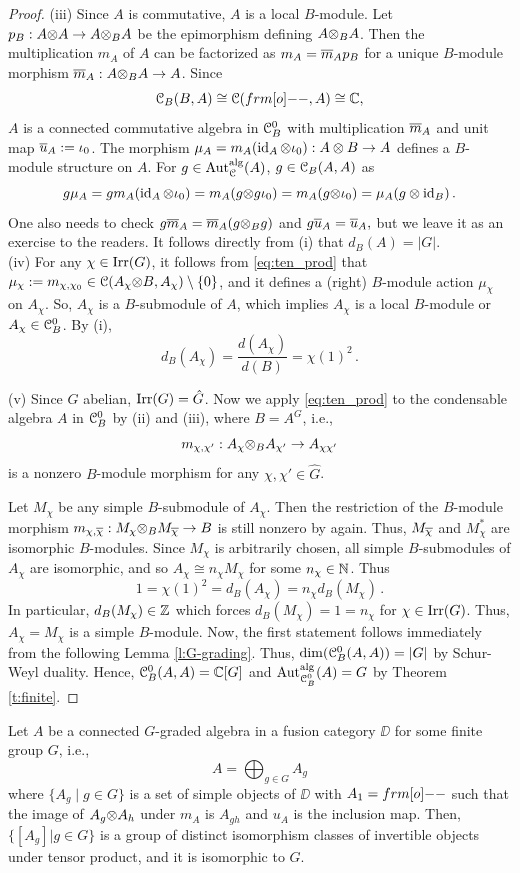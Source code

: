 \documentclass{amsart}
\begin{document}
\begin{proof}
(iii) Since $A$ is commutative, $A$ is a local $B$-module. Let $p_B: A {\otimes} A \to A {\otimes}_B A$ be the epimorphism defining $A {\otimes}_B A$. Then the multiplication $m_A$ of $A$ can be factorized as $m_A = \overline m_A p_B$ for a unique $B$-module morphism $\overline m_A: A {\otimes}_B A \to A$. Since
$$
\CB(B, A) \cong \CC(\1, A) \cong \BC,
$$
$A$ is a connected commutative algebra in ${{\EuScript{C}}_B^0}$ with multiplication $\overline m_A$ and unit map $\overline u_A :=\iota_0$. The morphism $\mu_A = m_A (\operatorname{id}_A {\otimes} \iota_0): A\otimes B\to A$ defines a $B$-module structure on $A.$
For $g \in {\operatorname{Aut}_{\EuScript{C}}^{\operatorname{alg}}}(A)$, $g \in {{\EuScript{C}}_B}(A,A)$ as 
$$
g \mu_A = g m_A (\operatorname{id}_A {\otimes} \iota_0) = m_A (g {\otimes} g \iota_0) =m_A (g {\otimes} \iota_0)=\mu_A(g\otimes \operatorname{id}_B)\,.
$$
One also needs to check $g \overline m_A = \overline m_A(g {\otimes}_B g)$ and $g \overline u_A=\overline u_A,$ but we leave it as an exercise to the readers. It follows directly from (i) that $d_B(A) =|G|$.\\
(iv) 
For any $\chi \in \operatorname{Irr}(G)$,  it follows from \eqref{eq:ten_prod} that $\mu_\chi:=m_{\chi, \chi_0} \in {\EuScript{C}}(A_\chi{\otimes} B, A_\chi) \setminus\{0\}$, and it
defines a (right) $B$-module action $\mu_\chi$ on $A_\chi$. So, $A_\chi$ is a $B$-submodule of $A$, which implies $A_\chi$ is a local $B$-module or $A_\chi \in {{\EuScript{C}}_B^0}$. By (i),
$$
d_B(A_\chi)=\frac{d(A_\chi)}{d(B)} = \chi(1)^2\,.
$$

(v) Since $G$ abelian, $\operatorname{Irr}(G)=\hat{G}$.  Now we apply \eqref{eq:ten_prod} to the condensable algebra $A$ in ${{\EuScript{C}}_B^0}$ by (ii) and (iii), where $B=A^G$, i.e.,
$$
m_{\chi, \chi'} : A_\chi {\otimes}_B A_{\chi'} \to A_{\chi\chi'} 
$$
is a nonzero $B$-module morphism for any  $\chi, \chi'  \in \hat G$. 

 Let $M_\chi$ be any simple $B$-submodule of $A_\chi$. Then the restriction of the $B$-module morphism $m_{\chi, \overline\chi}: M_\chi {\otimes}_B M_{\overline\chi} \to B$ is still nonzero  by \cite[Lemma 5.3]{DNRX2025} again.  Thus, $M_{\overline\chi}$ and $M_\chi^*$ are isomorphic $B$-modules. Since $M_\chi$ is arbitrarily chosen, all simple $B$-submodules of $A_\chi$ are isomorphic, and so $A_\chi \cong n_\chi M_\chi$ for some $n_\chi \in \mathbb{N}$. Thus
$$
1=\chi(1)^2 = d_B(A_\chi) = n_\chi d_B(M_\chi)\,.
$$
In particular, $d_B(M_\chi) \in \mathbb{Z}$ which forces $d_B(M_\chi)=1=n_\chi$ for $\chi \in \operatorname{Irr}(G)$.  Thus,  $A_\chi = M_\chi$ is a simple $B$-module. Now, the first statement follows immediately from the following Lemma \ref{l:G-grading}.  Thus, $\dim({{\EuScript{C}}_B^0}(A,A)) = |G|$ by Schur-Weyl duality. Hence, ${{\EuScript{C}}_B^0}(A,A) = \mathbb{C}[G]$ and ${\rm Aut}_{{{\EuScript{C}}_B^0}}^{\operatorname{alg}}(A) = G$ by Theorem \ref{t:finite}.
\end{proof}
\begin{lem}\label{l:G-grading}
Let $A$ be a  connected $G$-graded algebra in a fusion category  $\DD$ for some finite group $G$, i.e.,
$$
A = \bigoplus_{g \in G} A_{g}
$$
where $\{A_g \mid  g\in G\}$ is a set of simple objects of $\DD$ with $A_1 = \1$ such that the image of $A_g {\otimes} A_h$ under $m_A$ is $A_{gh}$ and $u_A$ is the inclusion map. Then, $\{[A_g]|g \in G\}$ is a group of distinct isomorphism classes of invertible objects under tensor product, and it is isomorphic to $G$. 
\end{lem}
\end{document}
